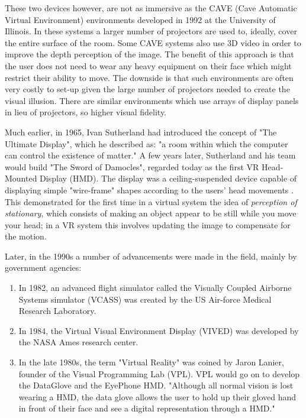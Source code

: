 These two devices however, are not as immersive as the CAVE (Cave Automatic Virtual Environment) environments developed in 1992 at the University of Illinois. In these systems a larger number of projectors are used to, ideally, cover the entire surface of the room. Some CAVE systems also use 3D video in order to improve the depth perception of the image. The benefit of this approach is that the user does not need to wear any heavy equipment on their face which might restrict their ability to move. The downside is that such environments are often very costly to set-up given the large number of projectors needed to create the visual illusion. There are similar environments which use arrays of display panels in lieu of projectors, so higher visual fidelity.


Much earlier, in 1965, Ivan Sutherland had introduced the concept of "The Ultimate Display", which he described as: "a room within which the computer can control the existence of matter." \cite{sutherland1965ultimate} A few years later, Sutherland and his team would build "The Sword of Damocles", regarded today as the first VR Head-Mounted Display (HMD). The display was a ceiling-suspended device capable of displaying simple "wire-frame" shapes according to the users' head movements \cite{hemstrom2020comparison}. This demonstrated for the first time in a virtual system the idea of \textit{perception of stationary}, which consists of making an object appear to be still while you move your head; in a VR system this involves updating the image to compensate for the motion.

Later, in the 1990s a number of advancements were made in the field, mainly by government agencies:

\begin{enumerate}
    \item In 1982, an advanced flight simulator called the Visually Coupled Airborne Systems simulator (VCASS) was created by the US Air-force Medical Research Laboratory.
    \item In 1984, the Virtual Visual Environment Display (VIVED) was developed by the NASA Ames research center. 
    \item In the late 1980s, the term "Virtual Reality" was coined by Jaron Lanier, founder of the Visual Programming Lab (VPL). VPL would go on to develop the DataGlove and the EyePhone HMD. "Although all normal vision is lost wearing a HMD, the data glove allows the user to hold up their gloved hand in front of their face and see a digital representation through a HMD." \cite{dixon2006history}
\end{enumerate}

